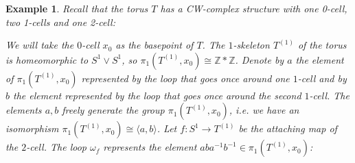 \documentclass[11pt, letterpaper, oneside]{report}
\theoremstyle{pplain}
\theoremstyle{ddefinition}
\newtheorem{example}[theorem]{Example}
\theoremstyle{nnn}
\theoremstyle{eexercise}
\newcommand{\Z}{{\mathbb Z}}
\begin{document}
\begin{example}
Recall that the torus $T$ has a CW-complex structure with one 0-cell, two 1-cells and one 2-cell:
 


We will take the $0$-cell $x_{0}$ as the basepoint of $T$.  
The $1$-skeleton $T^{(1)}$ of the torus is homeomorphic to $S^{1}\vee S^{1}$, so 
$\pi_{1}(T^{(1)}, x_{0})\cong \Z\ast \Z$. Denote by $a$ the element of 
 $\pi_{1}(T^{(1)}, x_{0})$ represented by the loop that goes once around one $1$-cell 
 and by $b$ the element  represented by the loop that goes once around the second $1$-cell. 
The elements $a, b$ freely generate the group $\pi_{1}(T^{(1)}, x_{0})$, i.e.  we have 
an isomorphism $\pi_{1}(T^{(1)}, x_{0}) \cong \langle a, b\rangle$. Let 
 $f\colon S^{1} \to T^{(1)}$ be the attaching map of the $2$-cell.  The loop $\omega_{f}$
 represents the element $aba^{-1}b^{-1} \in \pi_{1}(T^{(1)}, x_{0})$:
 

\end{example}
\end{document}

